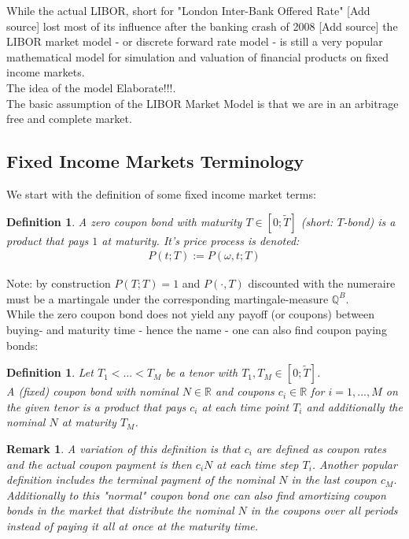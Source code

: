 \documentclass[12pt]{article}
\newtheorem{remark}[theorem]{Remark}
\newtheorem{definition}[theorem]{Definition}
\begin{document}
	While the actual LIBOR, short for "London Inter-Bank Offered Rate" \color{red}[Add source] \color{black} %
	lost most of its influence after the banking crash of 2008 \color{red}[Add source] \color{black} %
	the LIBOR market model - or discrete forward rate model - is still a very popular mathematical model for simulation and valuation of financial products on fixed income markets.\\
	The idea of the model  \color{red}Elaborate!!!\color{black}. 
	\\
	The basic assumption of the LIBOR Market Model is that we are in an arbitrage free and complete market.
	
	\subsection{Fixed Income Markets Terminology}
	We start with the definition of some fixed income market terms:
	\begin{definition}
		A \emph{zero coupon bond} with maturity $T \in [0;\tilde{T}]$ (short: $T$-bond) is a product that pays $1$ at maturity. It's price process is denoted:
		\begin{align*}
			P(t;T) := P(\omega,t;T)
		\end{align*}
	\end{definition}
	Note: by construction $P(T;T) = 1$ and $P(\cdot, T)$ discounted with the numeraire must be a martingale under the corresponding martingale-measure $\mathbb{Q}^B$.\\
	While the zero coupon bond does not yield any payoff (or coupons) between buying- and maturity time - hence the name - one can also find coupon paying bonds:
	\begin{definition}
		Let $T_1 < ... < T_M$ be a tenor with $T_1, T_M \in [0;\tilde{T}]$.\\
		A \emph{(fixed) coupon bond} with nominal $N \in \mathbb{R}$ and  coupons $c_i \in \mathbb{R}$ for $i=1, ...,M$ on the given tenor is a product that pays $c_i$ at each time point $T_i$ and additionally the nominal $N$ at maturity $T_M$.
	\end{definition}
	\begin{remark}
		A variation of this definition is that $c_i$ are defined as coupon rates and the actual coupon payment is then $c_i N$ at each time step $T_i$. Another popular definition includes the terminal payment of the nominal $N$ in the last coupon $c_M$. \\
		Additionally to this "normal" coupon bond one can also find \emph{amortizing} coupon bonds in the market that distribute the nominal $N$ in the coupons over all periods instead of paying it all at once at the maturity time.
	\end{remark}
\end{document}
